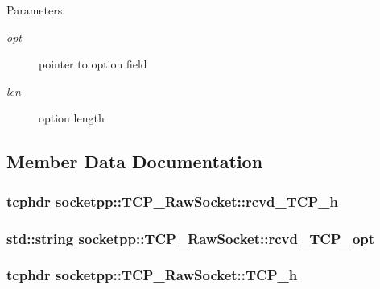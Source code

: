 \begin{Desc}
\item[Parameters:]
\begin{description}
\item[{\em opt}]pointer to option field \item[{\em len}]option length \end{description}
\end{Desc}


\subsection{Member Data Documentation}
\hypertarget{classsocketpp_1_1TCP__RawSocket_12b2d2f00d02c377301fc10e1209a8b8}{
\subsubsection[{rcvd\_\-TCP\_\-h}]{\setlength{\rightskip}{0pt plus 5cm}tcphdr {\bf socketpp::TCP\_\-RawSocket::rcvd\_\-TCP\_\-h}}}
\label{classsocketpp_1_1TCP__RawSocket_12b2d2f00d02c377301fc10e1209a8b8}


\hypertarget{classsocketpp_1_1TCP__RawSocket_b7bddcb31a7a310bcf61fcc474ded465}{
\subsubsection[{rcvd\_\-TCP\_\-opt}]{\setlength{\rightskip}{0pt plus 5cm}std::string {\bf socketpp::TCP\_\-RawSocket::rcvd\_\-TCP\_\-opt}}}
\label{classsocketpp_1_1TCP__RawSocket_b7bddcb31a7a310bcf61fcc474ded465}


\hypertarget{classsocketpp_1_1TCP__RawSocket_d1980411bd147dd67f6d9d9578414c17}{
\subsubsection[{TCP\_\-h}]{\setlength{\rightskip}{0pt plus 5cm}tcphdr {\bf socketpp::TCP\_\-RawSocket::TCP\_\-h}}}
\label{classsocketpp_1_1TCP__RawSocket_d1980411bd147dd67f6d9d9578414c17}


